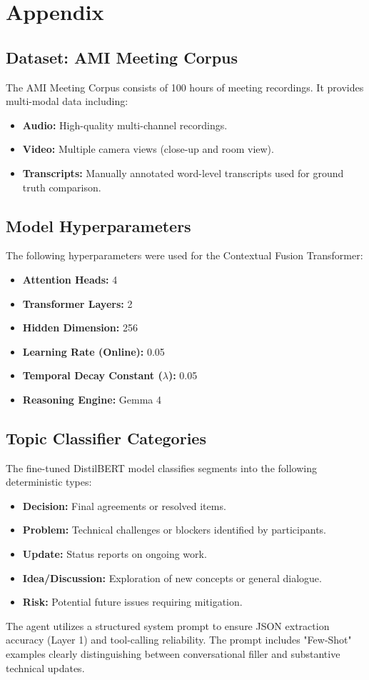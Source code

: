 \chapter{Appendix}

\section{Dataset: AMI Meeting Corpus}
The AMI Meeting Corpus consists of 100 hours of meeting recordings. It provides multi-modal data including:
\begin{itemize}
    \item \textbf{Audio:} High-quality multi-channel recordings.
    \item \textbf{Video:} Multiple camera views (close-up and room view).
    \item \textbf{Transcripts:} Manually annotated word-level transcripts used for ground truth comparison.
\end{itemize}

\section{Model Hyperparameters}
The following hyperparameters were used for the Contextual Fusion Transformer:
\begin{itemize}
    \item \textbf{Attention Heads:} 4
    \item \textbf{Transformer Layers:} 2
    \item \textbf{Hidden Dimension:} 256
    \item \textbf{Learning Rate (Online):} 0.05
    \item \textbf{Temporal Decay Constant ($\lambda$):} 0.05
    \item \textbf{Reasoning Engine:} Gemma 4
\end{itemize}

\section{Topic Classifier Categories}
The fine-tuned DistilBERT model classifies segments into the following deterministic types:
\begin{itemize}
    \item \textbf{Decision:} Final agreements or resolved items.
    \item \textbf{Problem:} Technical challenges or blockers identified by participants.
    \item \textbf{Update:} Status reports on ongoing work.
    \item \textbf{Idea/Discussion:} Exploration of new concepts or general dialogue.
    \item \textbf{Risk:} Potential future issues requiring mitigation.
\end{itemize}
The agent utilizes a structured system prompt to ensure JSON extraction accuracy (Layer 1) and tool-calling reliability. The prompt includes "Few-Shot" examples clearly distinguishing between conversational filler and substantive technical updates.